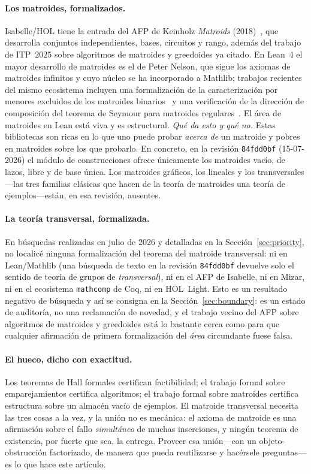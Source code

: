 \documentclass[11pt]{article}
\newcommand{\lean}[1]{\texttt{#1}}
\begin{document}
\paragraph{Los matroides, formalizados.} Isabelle/HOL tiene la entrada del AFP de Keinholz
\emph{Matroids} (2018)~\cite{afpmatroids}, que desarrolla conjuntos independientes, bases,
circuitos y rango, además del trabajo de ITP~2025 sobre algoritmos de matroides y greedoides ya
citado. En Lean~4 el mayor desarrollo de matroides es el de Peter Nelson, que sigue los axiomas de
matroides infinitos y cuyo núcleo se ha incorporado a Mathlib; trabajos recientes del mismo
ecosistema incluyen una formalización de la caracterización por menores excluidos de los matroides
binarios~\cite{binarymatroids} y una verificación de la dirección de composición del teorema de
Seymour para matroides regulares~\cite{seymour}. El área de matroides en Lean está viva y es
estructural. \emph{Qué da esto y qué no.} Estas bibliotecas son ricas en lo que uno puede probar
\emph{acerca de} un matroide y pobres en matroides sobre los que probarlo. En concreto, en la
revisión \lean{84fdd0bf} (15-07-2026) el módulo de construcciones ofrece únicamente los matroides
vacío, de lazos, libre y de base única. Los matroides gráficos, los lineales y los
transversales---las tres familias clásicas que hacen de la teoría de matroides una teoría de
ejemplos---están, en esa revisión, ausentes.

\paragraph{La teoría transversal, formalizada.} En búsquedas realizadas en julio de 2026 y
detalladas en la Sección~\ref{sec:priority}, no localicé ninguna formalización del teorema del
matroide transversal: ni en Lean/Mathlib (una búsqueda de texto en la revisión \lean{84fdd0bf}
devuelve solo el sentido de teoría de grupos de \emph{transversal}), ni en el AFP de Isabelle, ni
en Mizar, ni en el ecosistema \lean{mathcomp} de Coq, ni en HOL~Light. Esto es un resultado
negativo de búsqueda y así se consigna en la Sección~\ref{sec:boundary}: es un estado de auditoría,
no una reclamación de novedad, y el trabajo vecino del AFP sobre algoritmos de matroides y
greedoides está lo bastante cerca como para que cualquier afirmación de primera formalización del
\emph{área} circundante fuese falsa.

\paragraph{El hueco, dicho con exactitud.} Los teoremas de Hall formales certifican factibilidad;
el trabajo formal sobre emparejamientos certifica algoritmos; el trabajo formal sobre matroides
certifica estructura sobre un almacén vacío de ejemplos. El matroide transversal necesita las tres
cosas a la vez, y la unión no es mecánica: el axioma de matroide es una afirmación sobre el fallo
\emph{simultáneo} de muchas inserciones, y ningún teorema de existencia, por fuerte que sea, la
entrega. Proveer esa unión---con un objeto-obstrucción factorizado, de manera que pueda reutilizarse
y hacérsele preguntas---es lo que hace este artículo.
\end{document}
